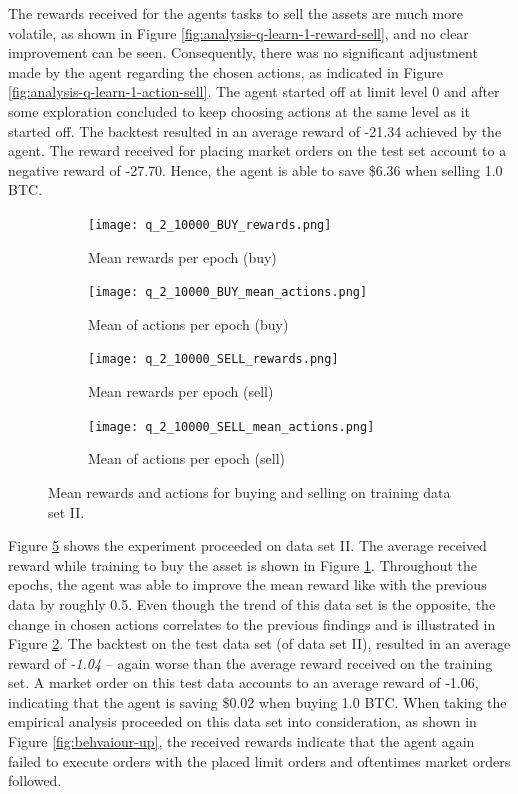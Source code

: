 The rewards received for the agents tasks to sell the assets are much more volatile, as shown in Figure \ref{fig:analysis-q-learn-1-reward-sell}, and no clear improvement can be seen.
Consequently, there was no significant adjustment made by the agent regarding the chosen actions, as indicated in Figure \ref{fig:analysis-q-learn-1-action-sell}.
The agent started off at limit level 0 and after some exploration concluded to keep choosing actions at the same level as it started off.
The backtest resulted in an average reward of -21.34 achieved by the agent.
The reward received for placing market orders on the test set account to a negative reward of -27.70.
Hence, the agent is able to save \$6.36 when selling 1.0 BTC.

\begin{figure}
    \centering
    \begin{subfigure}[b]{0.45\textwidth}
        \texttt{[image: q\_2\_10000\_BUY\_rewards.png]}
        \caption{Mean rewards per epoch (buy)}
        \label{fig:analysis-q-learn-2-reward-buy}
    \end{subfigure}
    \begin{subfigure}[b]{0.45\textwidth}
        \texttt{[image: q\_2\_10000\_BUY\_mean\_actions.png]}
        \caption{Mean of actions per epoch (buy)}
        \label{fig:analysis-q-learn-2-action-buy}
    \end{subfigure}
    \begin{subfigure}[b]{0.45\textwidth}
        \texttt{[image: q\_2\_10000\_SELL\_rewards.png]}
        \caption{Mean rewards per epoch (sell)}
        \label{fig:analysis-q-learn-2-reward-sell}
    \end{subfigure}
    \begin{subfigure}[b]{0.45\textwidth}
        \texttt{[image: q\_2\_10000\_SELL\_mean\_actions.png]}
        \caption{Mean of actions per epoch (sell)}
        \label{fig:analysis-q-learn-2-action-sell}
    \end{subfigure}
    \caption{Mean rewards and actions for buying and selling on training data set II.}
    \label{fig:analysis-q-learn-2}
\end{figure}

Figure \ref{fig:analysis-q-learn-2} shows the experiment proceeded on data set II.
The average received reward while training to buy the asset is shown in Figure \ref{fig:analysis-q-learn-2-reward-buy}.
Throughout the epochs, the agent was able to improve the mean reward like with the previous data by roughly 0.5.
Even though the trend of this data set is the opposite, the change in chosen actions correlates to the previous findings and is illustrated in Figure \ref{fig:analysis-q-learn-2-action-buy}.
The backtest on the test data set (of data set II), resulted in an average reward of \textit{-1.04} -- again worse than the average reward received on the training set.
A market order on this test data accounts to an average reward of -1.06, indicating that the agent is saving \$0.02 when buying 1.0 BTC.
When taking the empirical analysis proceeded on this data set into consideration, as shown in Figure \ref{fig:behvaiour-up}, the received rewards indicate that the agent again failed to execute orders with the placed limit orders and oftentimes market orders followed.

